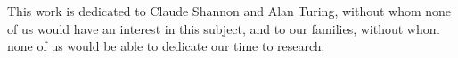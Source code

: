 
%
%
%

\begin{dedication}
This work is dedicated to Claude Shannon and Alan Turing, without whom none of us would have an interest in this subject, and to our families, without whom none of us would be able to dedicate our time to research.
\end{dedication}